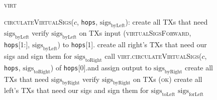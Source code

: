 \begin{figure}[H]
  \begin{processbox}{\textsc{virt}}
    \begin{algorithmic}[1]
      \State \textsc{circulateVirtualSigs}($c$, \texttt{hops},
      $\mathrm{sigs}_{\mathrm{byLeft}}$):
      \Indent
         
          \State create all TXs that need $\mathrm{sigs}_{\mathrm{byLeft}}$
          \TODO{}
          \State verify $\mathrm{sigs}_{\mathrm{byLeft}}$ on TXs \TODO{}
           
            \State input (\textsc{virtualSigsForward}, \texttt{hops}[1:],
            $\mathrm{sigs}_{\mathrm{byLeft}}$) to \texttt{hops}[1].\alice{}
            \State {} \TODO{}
            \State {}
            \State {} \TODO{}
            \State {}
            \TODO{}
            \State {} 
          \EndIf
        \Else \: 
          \State create all right's TXs that need our sigs and sign them for
          $\mathrm{sigs}_{\mathrm{toRight}}$ \TODO{}
          \State call \textsc{virt.circulateVirtualSigs}($c$, \texttt{hops},
          $\mathrm{sigs}_{\mathrm{toRight}}$) of \texttt{hops}[0].\bob and
          assign output to $\mathrm{sigs}_{\mathrm{byRight}}$
          \State create all TXs that need $\mathrm{sigs}_{\mathrm{byRight}}$
          \TODO{}
          \State verify $\mathrm{sigs}_{\mathrm{byRight}}$ on TXs \TODO{}
          \State \Return (\textsc{ok})
        \EndIf
          \State create all left's TXs that need our sigs and sign
          them for $\mathrm{sigs}_{\mathrm{toLeft}}$ \TODO{}
          \State \Return $\mathrm{sigs}_{\mathrm{forLeft}}$
        \EndIf
      \EndIndent
    \end{algorithmic}
  \end{processbox}
  \caption{}
  \label{code:virtual-layer:virtual-sigs}
\end{figure}

